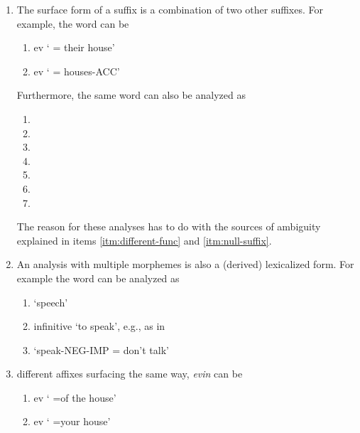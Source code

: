 \documentclass[twocolumn]{article}
\begin{document}
\begin{enumerate}
\item\label{itm:sub-suffix} The surface form of a suffix is a combination of two other suffixes. For example, the word  can be
    \begin{enumerate}
        \item ev ` = their house'
        \item ev ` = houses-ACC'
    \end{enumerate}
Furthermore, the same word can also be analyzed as 
    \begin{enumerate}
        \item {}
    \item {}
    \item {}
    \item {}
    \item {}
    \item {} 
    \item {}
    \end{enumerate}
The reason for these analyses has to do with the sources of ambiguity explained in items \ref{itm:different-func} and \ref{itm:null-suffix}.
\item An analysis with multiple morphemes is also a (derived) lexicalized form. For example the word  can be analyzed as 
    \begin{enumerate}
        \item {} `speech'
        \item {}  infinitive `to speak', e.g., as in 
        \item {} `speak-NEG-IMP = don't talk'
    \end{enumerate}
\item\label{itm:same-surface} different affixes surfacing the same way, \emph{evin} can be
    \begin{enumerate}
        \item ev ` =of the house'
        \item ev  ` =your house'

\end{enumerate}
\end{enumerate}
\end{document}
